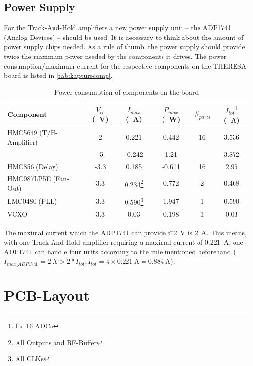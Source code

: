 \subsection{Power Supply}
For the Track-And-Hold amplifiers a new power supply unit -- the ADP1741 (Analog Devices) -- should be used. It is necessary to think about the amount of power supply chips needed. As a rule of thumb, the power supply should provide twice the maximum power needed by the components it drives. The power consumption/maximum current for the respective components on the THERESA board is listed in \autoref{tab:kapturecomp}. 
\begin{table}[tbh]
	\caption{Power consumption of components on the board}
	\label{tab:kapturecomp}
	\begin{minipage}{\textwidth}
		\centering
		\begin{tabularx}{\textwidth}{XSSSSS}
			\toprule
			\textbf{Component} & \textbf{$V_{cc}$ (\SI{}{\volt})} & \textbf{$I_{max}$ (\SI{}{\ampere})} & \textbf{$P_{max}$ (\SI{}{\watt})} & $\#_{parts}$ & \textbf{$I_{tot}$}\footnote{for 16 ADCs} (\SI{}{\ampere})\\
				\midrule
			HMC5649 (T/H-Amplifier) 	& 2	  	& 0.221 	 & 0.442 & 16 & 3.536\\
									& -5  	& -0.242 & 1.21 &  & 3.872\\
			HMC856 (Delay) 			& -3.3	& 0.185 & -0.611 & 16 & 2.96\\
			HMC987LP5E (Fan-Out) 	& 3.3 	& 0.234\footnote{All Outputs and RF-Buffer} & 0.772 & 2 & 0.468\\
			LMC0480 (PLL) 			& 3.3 	& 0.590\footnote{All CLKs} & 1.947 & 1 & 0.590\\
			VCXO 					& 3.3 	& 0.03 & 0.198 & 1 & 0.03\\
			\bottomrule
		\end{tabularx}
	\end{minipage}
\end{table}

The maximal current which the ADP1741 can provide @\SI{2}{\volt} is \SI{2}{\ampere}. This means, with one Track-And-Hold amplifier requiring a maximal current of \SI{0.221}{\ampere}, one ADP1741 can handle four units according to the rule mentioned beforehand ($I_{max\_ADP1741} = \SI{2}{\ampere} > 2 * I_{tot}, I_{tot} = 4 \times \SI{0.221}{\ampere} =  \SI{0.884}{\ampere}$).



\newpage
\section{PCB-Layout}
